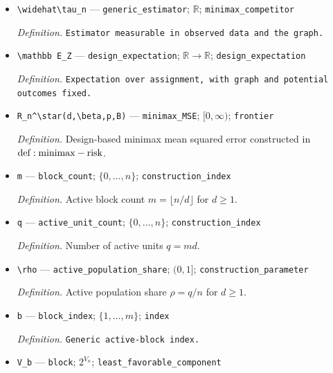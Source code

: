 \documentclass{article}
\begin{document}
\begin{itemize}
  \par\smallskip\noindent\emph{Definition.} Projection of SNIPE onto \([-B,B]\).
  \item \texttt{\textbackslash{}\allowbreak{}widehat\textbackslash{}\allowbreak{}tau\_\allowbreak{}n} --- \texttt{generic\_\allowbreak{}estimator}; \(\mathbb R\); \texttt{minimax\_\allowbreak{}competitor}
  \par\smallskip\noindent\emph{Definition.} \texttt{Estimator measurable in observed data and the graph.}
  \item \texttt{\textbackslash{}\allowbreak{}mathbb E\_\allowbreak{}Z} --- \texttt{design\_\allowbreak{}expectation}; \(\mathbb R\to\mathbb R\); \texttt{design\_\allowbreak{}expectation}
  \par\smallskip\noindent\emph{Definition.} \texttt{Expectation over assignment,\allowbreak{} with graph and potential outcomes fixed.}
  \item \texttt{R\_\allowbreak{}n\textasciicircum{}\textbackslash{}\allowbreak{}star(d,\allowbreak{}\textbackslash{}\allowbreak{}beta,\allowbreak{}p,\allowbreak{}B)} --- \texttt{minimax\_\allowbreak{}MSE}; \([0,\infty)\); \texttt{frontier}
  \par\smallskip\noindent\emph{Definition.} Design-based minimax mean squared error constructed in \({\rm def:minimax-risk}\).
  \item \texttt{m} --- \texttt{block\_\allowbreak{}count}; \(\{0,\ldots,n\}\); \texttt{construction\_\allowbreak{}index}
  \par\smallskip\noindent\emph{Definition.} Active block count \(m=\lfloor n/d\rfloor\) for \(d\ge1\).
  \item \texttt{q} --- \texttt{active\_\allowbreak{}unit\_\allowbreak{}count}; \(\{0,\ldots,n\}\); \texttt{construction\_\allowbreak{}index}
  \par\smallskip\noindent\emph{Definition.} Number of active units \(q=md\).
  \item \texttt{\textbackslash{}\allowbreak{}rho} --- \texttt{active\_\allowbreak{}population\_\allowbreak{}share}; \((0,1]\); \texttt{construction\_\allowbreak{}parameter}
  \par\smallskip\noindent\emph{Definition.} Active population share \(\rho=q/n\) for \(d\ge1\).
  \item \texttt{b} --- \texttt{block\_\allowbreak{}index}; \(\{1,\ldots,m\}\); \texttt{index}
  \par\smallskip\noindent\emph{Definition.} \texttt{Generic active-\allowbreak{}block index.}
  \item \texttt{V\_\allowbreak{}b} --- \texttt{block}; \(2^{V_n}\); \texttt{least\_\allowbreak{}favorable\_\allowbreak{}component}

\end{itemize}
\end{document}
